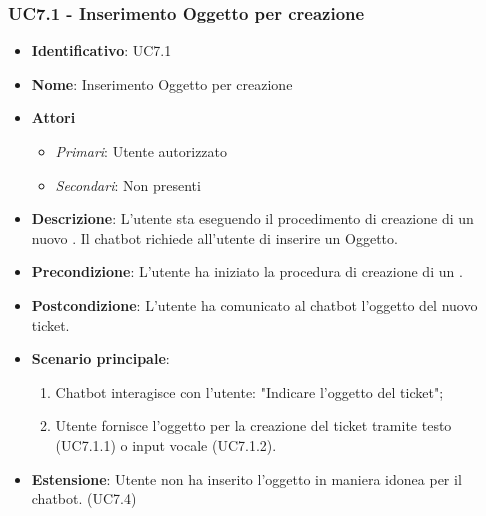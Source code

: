 \subsubsection{UC7.1 - Inserimento Oggetto per creazione }
\begin{itemize}
	\item \textbf{Identificativo}: UC7.1
	\item \textbf{Nome}: Inserimento Oggetto per creazione  
	\item \textbf{Attori}
	\begin{itemize} 
		\item \textit{Primari}: Utente autorizzato
		\item \textit{Secondari}: Non presenti
	\end{itemize}
	\item \textbf{Descrizione}: L'utente sta eseguendo il procedimento di creazione di un nuovo . Il chatbot richiede all'utente di inserire un Oggetto. 
	\item \textbf{Precondizione}: L'utente ha iniziato la procedura di creazione di un .
	\item \textbf{Postcondizione}: L'utente ha comunicato al chatbot l'oggetto del nuovo ticket.
	\item \textbf{Scenario principale}: \begin{enumerate}
		\item Chatbot interagisce con l'utente: "Indicare l'oggetto del ticket";
		\item Utente fornisce l'oggetto per la creazione del ticket tramite testo (UC7.1.1) o input vocale (UC7.1.2). 
	\end{enumerate}
	\item \textbf{Estensione}: Utente non ha inserito l'oggetto in maniera idonea per il chatbot. (UC7.4)		
\end{itemize}

